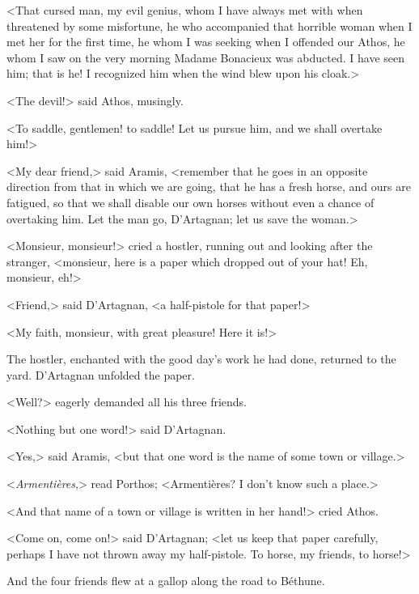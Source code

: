 <That cursed man, my evil genius, whom I have always met with when threatened by some misfortune, he who accompanied that horrible woman when I met her for the first time, he whom I was seeking when I offended our Athos, he whom I saw on the very morning Madame Bonacieux was abducted. I have seen him; that is he! I recognized him when the wind blew upon his cloak.> 

<The devil!> said Athos, musingly. 

<To saddle, gentlemen! to saddle! Let us pursue him, and we shall overtake him!> 

<My dear friend,> said Aramis, <remember that he goes in an opposite direction from that in which we are going, that he has a fresh horse, and ours are fatigued, so that we shall disable our own horses without even a chance of overtaking him. Let the man go, D'Artagnan; let us save the woman.> 

<Monsieur, monsieur!> cried a hostler, running out and looking after the stranger, <monsieur, here is a paper which dropped out of your hat! Eh, monsieur, eh!> 

<Friend,> said D'Artagnan, <a half-pistole for that paper!> 

<My faith, monsieur, with great pleasure! Here it is!> 

The hostler, enchanted with the good day's work he had done, returned to the yard. D'Artagnan unfolded the paper. 

<Well?> eagerly demanded all his three friends. 

<Nothing but one word!> said D'Artagnan. 

<Yes,> said Aramis, <but that one word is the name of some town or village.> 

<\textit{Armentières},> read Porthos; <Armentières? I don't know such a place.> 

<And that name of a town or village is written in her hand!> cried Athos. 

<Come on, come on!> said D'Artagnan; <let us keep that paper carefully, perhaps I have not thrown away my half-pistole. To horse, my friends, to horse!> 

And the four friends flew at a gallop along the road to Béthune.